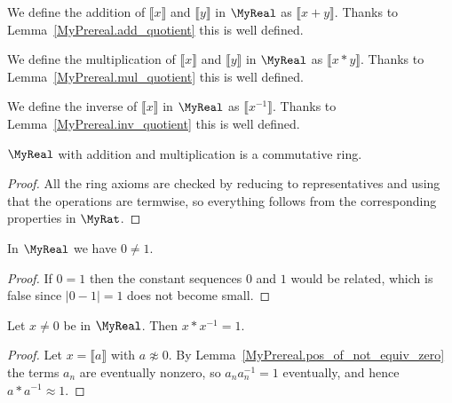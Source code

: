 \begin{definition}
    \label{MyReal.add}
    \leanok
We define the addition of $⟦ x ⟧$ and $⟦ y ⟧$ in $\MyReal$ as $⟦ x + y ⟧$. Thanks to
Lemma~\ref{MyPrereal.add_quotient} this is well defined.
\end{definition}

\begin{definition}
    \label{MyReal.mul}
    \leanok
We define the multiplication of $⟦ x ⟧$ and $⟦ y ⟧$ in $\MyReal$ as $⟦ x * y ⟧$. Thanks to
Lemma~\ref{MyPrereal.mul_quotient} this is well defined.
\end{definition}

\begin{definition}
    \label{MyReal.inv}
    \leanok
We define the inverse of $⟦ x ⟧$ in $\MyReal$ as $⟦ x^{-1} ⟧$. Thanks to
Lemma~\ref{MyPrereal.inv_quotient} this is well defined.
\end{definition}

\begin{proposition}
    \label{MyReal.commRing}
    \leanok
    $\MyReal$ with addition and multiplication is a commutative ring.
\end{proposition}
\begin{proof}
    \leanok
    All the ring axioms are checked by reducing to representatives and using that the operations are
    termwise, so everything follows from the corresponding properties in $\MyRat$.
\end{proof}

\begin{lemma}
    \label{MyReal.zero_ne_one}
    \leanok
In $\MyReal$ we have $0 \neq 1$.
\end{lemma}
\begin{proof}
    \leanok
    If $0 = 1$ then the constant sequences $0$ and $1$ would be related, which is false since
    $|0 - 1| = 1$ does not become small.
\end{proof}

\begin{lemma}
    \label{MyReal.mul_inv_cancel}
    \leanok
Let $x \neq 0$ be in $\MyReal$. Then $x * x^{-1} = 1$.
\end{lemma}
\begin{proof}
    \leanok
    Let $x = ⟦ a ⟧$ with $a \not\approx 0$. By Lemma~\ref{MyPrereal.pos_of_not_equiv_zero} the terms
    $a_n$ are eventually nonzero, so $a_n a_n^{-1} = 1$ eventually, and hence $a * a^{-1} \approx 1$.
\end{proof}

